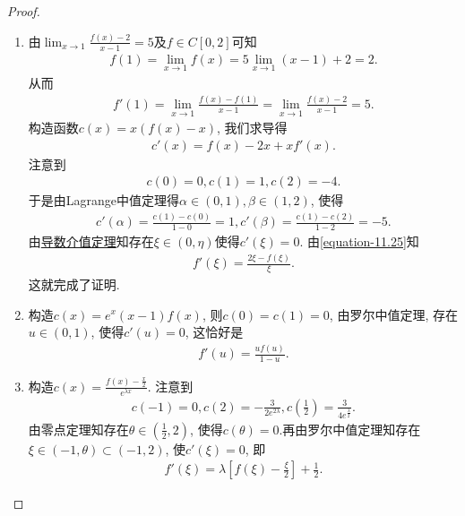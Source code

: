 \documentclass[../../main.tex]{subfiles}
\begin{document}
\begin{proof}
\begin{enumerate}
\item 由\(\lim_{x\rightarrow 1}\frac{f(x) - 2}{x - 1}=5\)及\(f\in C[0,2]\)可知
\begin{align*}
f(1)=\lim_{x\rightarrow 1}f(x)=5\lim_{x\rightarrow 1}(x - 1)+2=2.
\end{align*}
从而
\begin{align*}
f'(1)=\lim_{x\rightarrow 1}\frac{f(x)-f(1)}{x - 1}=\lim_{x\rightarrow 1}\frac{f(x)-2}{x - 1}=5.
\end{align*}
构造函数\(c(x)=x(f(x)-x)\), 我们求导得
\begin{align}\label{equation-11.25}
c'(x)=f(x)-2x+xf'(x).
\end{align}
注意到
\begin{align*}
c(0)=0,c(1)=1,c(2)=-4.
\end{align*}
于是由Lagrange中值定理得\(\alpha\in(0,1),\beta\in(1,2)\), 使得
\begin{align*}
c'(\alpha)=\frac{c(1)-c(0)}{1 - 0}=1,c'(\beta)=\frac{c(1)-c(2)}{1 - 2}=-5.
\end{align*}
由\hyperref[theorem:导数介值定理]{导数介值定理}知存在\(\xi\in(0,\eta)\)使得\(c'(\xi)=0\). 由\eqref{equation-11.25}知
\begin{align*}
f'(\xi)=\frac{2\xi - f(\xi)}{\xi}.
\end{align*}
这就完成了证明.

\item 构造\(c(x)=e^{x}(x - 1)f(x)\), 则\(c(0)=c(1)=0\), 由罗尔中值定理, 存在\(u\in(0,1)\), 使得\(c'(u)=0\), 这恰好是
\begin{align*}
f'(u)=\frac{uf(u)}{1 - u}.
\end{align*}

\item 构造\(c(x)=\frac{f(x)-\frac{x}{2}}{e^{\lambda x}}\). 注意到
\begin{align*}
c(-1)=0,c(2)=-\frac{3}{2e^{2\lambda}},c\left(\frac{1}{2}\right)=\frac{3}{4e^{\frac{\lambda}{2}}}.
\end{align*}
由零点定理知存在\(\theta\in(\frac{1}{2},2)\), 使得\(c(\theta)=0\).再由罗尔中值定理知存在\(\xi\in(-1,\theta)\subset(-1,2)\), 使\(c'(\xi)=0\), 即
\begin{align*}
f'(\xi)=\lambda\left[f(\xi)-\frac{\xi}{2}\right]+\frac{1}{2}.
\end{align*}
\end{enumerate}
\end{proof}
\end{document}
